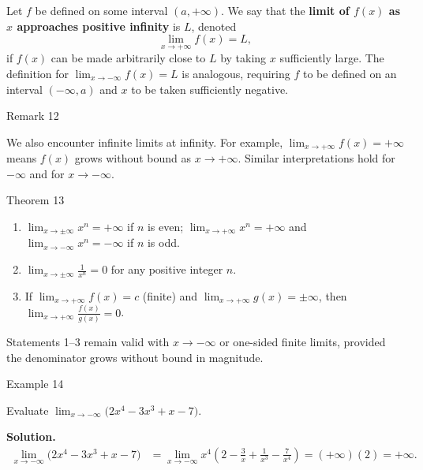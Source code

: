 \medskip

Let \(f\) be defined on some interval \((a, +\infty)\). We say that the \textbf{limit of \(f(x)\) as \(x\) approaches positive infinity} is \(L\), denoted
\[
\lim_{x \to +\infty} f(x) = L,
\]
if \(f(x)\) can be made arbitrarily close to \(L\) by taking \(x\) sufficiently large. The definition for \(\lim_{x \to -\infty} f(x) = L\) is analogous, requiring \(f\) to be defined on an interval \((-\infty, a)\) and \(x\) to be taken sufficiently negative.


\begin{remarkbox}{Remark 12}

We also encounter infinite limits at infinity. For example, \(\lim_{x \to +\infty} f(x) = +\infty\) means \(f(x)\) grows without bound as \(x \to +\infty\). Similar interpretations hold for \(-\infty\) and for \(x \to -\infty\).
\end{remarkbox}


\begin{theorembox}{Theorem 13}

\begin{enumerate}
    \item \(\displaystyle\lim_{x \to \pm\infty} x^{n} = +\infty\) if \(n\) is even; \(\displaystyle\lim_{x \to +\infty} x^{n} = +\infty\) and \(\displaystyle\lim_{x \to -\infty} x^{n} = -\infty\) if \(n\) is odd.

    \item \(\displaystyle\lim_{x \to \pm\infty} \frac{1}{x^{n}} = 0\) for any positive integer \(n\).

    \item If \(\displaystyle\lim_{x \to +\infty} f(x) = c\) (finite) and \(\displaystyle\lim_{x \to +\infty} g(x) = \pm\infty\), then \(\displaystyle\lim_{x \to +\infty} \frac{f(x)}{g(x)} = 0\).
\end{enumerate}
Statements 1--3 remain valid with \(x \to -\infty\) or one-sided finite limits, provided the denominator grows without bound in magnitude.
\end{theorembox}


\begin{examplebox}{Example 14}

Evaluate \(\displaystyle\lim_{x \to -\infty} \bigl(2x^{4} - 3x^{3} + x - 7\bigr)\).

\medskip
\textbf{Solution.}
\begin{align*}
\lim_{x \to -\infty} \bigl(2x^{4} - 3x^{3} + x - 7\bigr)
    &= \lim_{x \to -\infty} x^{4} \left(2 - \frac{3}{x} + \frac{1}{x^{3}} - \frac{7}{x^{4}}\right)
     = (+\infty)(2)
     = +\infty.
\end{align*}
\end{examplebox}


